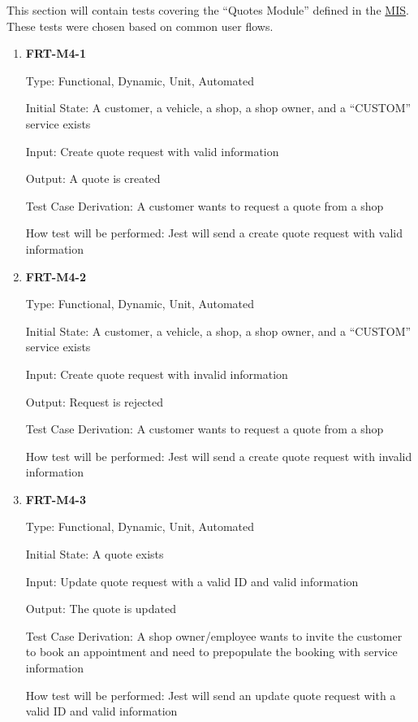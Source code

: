 \documentclass[12pt, titlepage]{article}
\begin{document}
This section will contain tests covering the ``Quotes Module'' defined in the
\href{https://github.com/arkinmodi/project-sayyara/blob/main/docs/Design/MIS/MIS.pdf}{MIS}. These
tests were chosen based on common user flows.

\begin{enumerate}

	\item \textbf{FRT-M4-1}

	      Type: Functional, Dynamic, Unit, Automated

	      Initial State: A customer, a vehicle, a shop, a shop owner, and a ``CUSTOM'' service exists

	      Input: Create quote request with valid information

	      Output: A quote is created

	      Test Case Derivation: A customer wants to request a quote from a shop

	      How test will be performed: Jest will send a create quote request with valid information

	\item \textbf{FRT-M4-2}

	      Type: Functional, Dynamic, Unit, Automated

	      Initial State: A customer, a vehicle, a shop, a shop owner, and a ``CUSTOM'' service exists

	      Input: Create quote request with invalid information

	      Output: Request is rejected

	      Test Case Derivation: A customer wants to request a quote from a shop

	      How test will be performed: Jest will send a create quote request with invalid information

	\item \textbf{FRT-M4-3}

	      Type: Functional, Dynamic, Unit, Automated

	      Initial State: A quote exists

	      Input: Update quote request with a valid ID and valid information

	      Output: The quote is updated

	      Test Case Derivation: A shop owner/employee wants to invite the customer to book an appointment and
	      need to prepopulate the booking with service information

	      How test will be performed: Jest will send an update quote request with a valid ID and valid
	      information


\end{enumerate}
\end{document}

